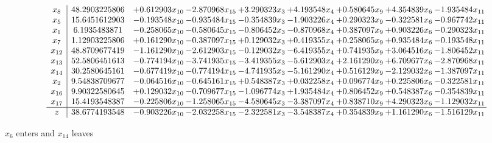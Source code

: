 \documentclass[10pt]{article}
\begin{document}
 \[\begin{array}{c| c c@{\hskip 2pt} c@{\hskip 2pt} c@{\hskip 2pt} c@{\hskip 2pt} c@{\hskip 2pt} c@{\hskip 2pt} c@{\hskip 2pt} }
 x_{8}   &  48.2903225806 & + 0.612903 x_{10} & -2.870968 x_{15} & + 3.290323 x_{3} & + 4.193548 x_{4} & + 0.580645 x_{9} & + 4.354839 x_{6} & -1.935484 x_{11}\\
 x_{5}   &  15.6451612903 & -0.193548 x_{10} & -0.935484 x_{15} & -0.354839 x_{3} & -1.903226 x_{4} & + 0.290323 x_{9} & -0.322581 x_{6} & -0.967742 x_{11}\\
 x_{1}   &  6.1935483871 & -0.258065 x_{10} & -0.580645 x_{15} & -0.806452 x_{3} & -0.870968 x_{4} & + 0.387097 x_{9} & + 0.903226 x_{6} & -0.290323 x_{11}\\
 x_{7}   &  1.12903225806 & + 0.161290 x_{10} & -0.387097 x_{15} & + 0.129032 x_{3} & + 0.419355 x_{4} & + 0.258065 x_{9} & + 0.935484 x_{6} & -0.193548 x_{11}\\
 x_{12}   &  48.8709677419 & -1.161290 x_{10} & -2.612903 x_{15} & -0.129032 x_{3} & -6.419355 x_{4} & + 0.741935 x_{9} & + 3.064516 x_{6} & -1.806452 x_{11}\\
 x_{13}   &  52.5806451613 & -0.774194 x_{10} & -3.741935 x_{15} & -3.419355 x_{3} & -5.612903 x_{4} & + 2.161290 x_{9} & + 6.709677 x_{6} & -2.870968 x_{11}\\
 x_{14}   &  30.2580645161 & -0.677419 x_{10} & -0.774194 x_{15} & -4.741935 x_{3} & -5.161290 x_{4} & + 0.516129 x_{9} & -2.129032 x_{6} & -1.387097 x_{11}\\
 x_{2}   &  9.54838709677 & -0.064516 x_{10} & -0.645161 x_{15} & + 0.548387 x_{3} & + 0.032258 x_{4} & + 0.096774 x_{9} & + 0.225806 x_{6} & -0.322581 x_{11}\\
 x_{16}   &  9.90322580645 & + 0.129032 x_{10} & -0.709677 x_{15} & -1.096774 x_{3} & + 1.935484 x_{4} & + 0.806452 x_{9} & + 0.548387 x_{6} & -0.354839 x_{11}\\
 x_{17}   &  15.4193548387 & -0.225806 x_{10} & -1.258065 x_{15} & -4.580645 x_{3} & -3.387097 x_{4} & + 0.838710 x_{9} & + 4.290323 x_{6} & -1.129032 x_{11}\\
\hline
z    &  38.6774193548 & -0.903226 x_{10} & -2.032258 x_{15} & -2.322581 x_{3} & -3.548387 x_{4} & + 0.354839 x_{9} & + 1.161290 x_{6} & -1.516129 x_{11}\\
\end{array}\]


 $ x_{6} $ enters and $ x_{14} $ leaves 
\end{document}
